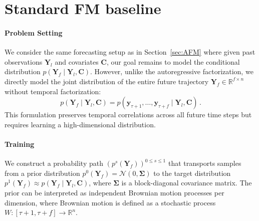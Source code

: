 \documentclass[preprint,12pt,authoryear]{elsarticle}
\begin{document}
\section{Standard FM baseline}\label{app:nafm}

\paragraph{Problem Setting} 
We consider the same forecasting setup as in Section~\ref{sec:AFM} where given past observations $\mathbf{Y}_l$ and covariates $\mathbf{C}$, our goal remains to model the conditional distribution $p(\mathbf{Y}_f \mid \mathbf{Y}_l, \mathbf{C})$. However, unlike the autoregressive factorization, we directly model the joint distribution of the entire future trajectory $\mathbf{Y}_f \in \mathbb{R}^{f \times n}$ without temporal factorization:
\begin{equation}
    p(\mathbf{Y}_f \mid \mathbf{Y}_l, \mathbf{C}) = p(\mathbf{y}_{\tau+1}, \ldots, \mathbf{y}_{\tau+f} \mid \mathbf{Y}_l, \mathbf{C}) \,.
\end{equation}
This formulation preserves temporal correlations across all future time steps but requires learning a high-dimensional distribution.

\paragraph{Training}
We construct a probability path $(p^s(\mathbf{Y}_f))^{0\leq s \leq 1}$ that transports samples from a prior distribution $p^0(\mathbf{Y}_f) = \mathcal{N}(0, \mathbf{\Sigma})$ to the target distribution $p^1(\mathbf{Y}_f) \approx p(\mathbf{Y}_f\mid\mathbf{Y}_l,\mathbf{C})$, where $\mathbf{\Sigma}$ is a block-diagonal covariance matrix. The prior can be interpreted as independent Brownian motion processes per dimension, where Brownian motion is defined as a stochastic process $W \colon [\tau+1,\tau+f] \to \mathbb{R}^n$.
\end{document}
